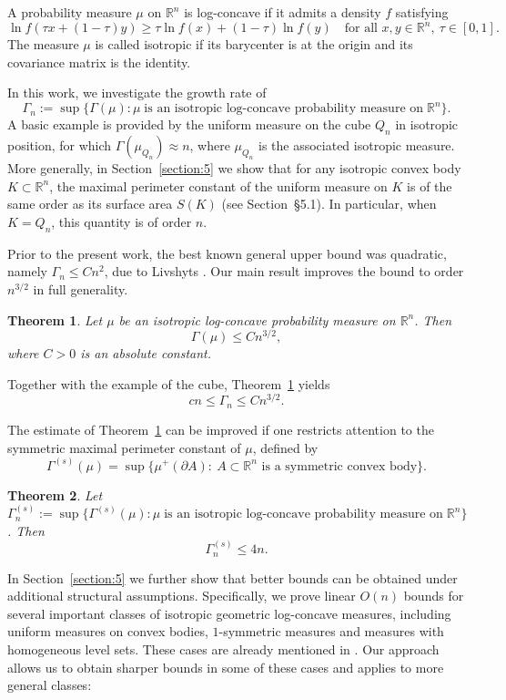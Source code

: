 \documentclass[11pt,leqno]{article}
\newtheorem{theorem}{Theorem}[section]
\theoremstyle{remark}
\numberwithin{equation}{section}
\newcommand{\ls}{\leqslant}
\newcommand{\gr}{\geqslant}
\begin{document}
\medskip 

A probability measure $\mu$ on $\mathbb{R}^n$ is log-concave if it admits a density $f$ satisfying
$$\ln f(\tau x + (1-\tau)y) \gr \tau \ln f(x)+(1-\tau)\ln f(y)\quad \text{for all } x,y\in\mathbb{R}^n, \ \tau\in[0,1].$$
The measure $\mu$ is called isotropic if its barycenter is at the origin and its covariance matrix is the identity.  

In this work, we investigate the growth rate of
$$\Gamma_n:=\sup\{\Gamma(\mu):\mu\;\text{is an isotropic log-concave probability measure on}\;\mathbb{R}^n\}.$$
A basic example is provided by the uniform measure on the cube $Q_n$ in isotropic position, for which $\Gamma(\mu_{Q_n})\approx n$, where $\mu_{Q_n}$ is the 
associated isotropic measure. More generally, in Section~\ref{section:5}  we show that for any isotropic convex body $K\subset\mathbb{R}^n$, the maximal perimeter constant of the uniform measure on $K$ is of the same order as its surface area $S(K)$ (see Section~\S 5.1). 
In particular, when $K = Q_n$, this quantity is of order $n$.

Prior to the present work, the best known general upper bound was quadratic, namely $\Gamma_n \ls C n^2$, due to Livshyts \cite{Livshyts-2021}.
Our main result improves the bound to order $n^{3/2}$ in full generality.

\begin{theorem}\label{th:main-upper-bound}
Let $\mu$ be an isotropic log-concave probability measure on $\mathbb{R}^n$. 
Then
$$\Gamma(\mu)\ls Cn^{3/2},$$
where $C>0$ is an absolute constant.
\end{theorem}

Together with the example of the cube, Theorem~\ref{th:main-upper-bound} yields
$$cn\ls \Gamma_n \ls Cn^{3/2}.$$

The estimate of Theorem~\ref{th:main-upper-bound} can be improved if one restricts attention to the symmetric maximal perimeter constant of $\mu$, defined by
$$\Gamma^{(s)}(\mu)=\sup\big\{\mu^+(\partial A):\ A \subset \mathbb{R}^n \text{ is a symmetric convex body}\big\}.$$

\begin{theorem}\label{th:symmetric-main-upper-bound}
Let $\Gamma_n^{(s)}:=\sup\{\Gamma^{(s)}(\mu):\mu\;\text{is an isotropic log-concave probability measure on}\;\mathbb{R}^n\}$.
Then
$$\Gamma_n^{(s)}\ls 4n.$$
\end{theorem}

In Section~\ref{section:5} we further show that better bounds can be obtained under additional structural assumptions. 
Specifically, we prove linear $O(n)$ bounds for several important classes of isotropic geometric log-concave measures, 
including uniform measures on convex bodies, $1$-symmetric measures and measures with homogeneous level sets. These cases are already mentioned
in \cite{Livshyts-2021}. Our approach allows us to obtain sharper bounds in some of these cases and applies to more general classes:
\end{document}
